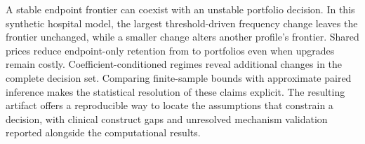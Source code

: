 A stable endpoint frontier can coexist with an unstable portfolio decision.
In this synthetic hospital model, the largest threshold-driven frequency
change leaves the frontier unchanged, while a smaller change alters another
profile's frontier. Shared prices reduce endpoint-only retention from
\CertGuaranteedTotal{} to \JointRetainedFloored{} portfolios even when
upgrades remain costly. Coefficient-conditioned regimes reveal additional
changes in the complete decision set. Comparing finite-sample bounds with
approximate paired inference makes the statistical resolution of these
claims explicit. The resulting artifact offers a reproducible way to locate
the assumptions that constrain a decision, with clinical construct gaps and
unresolved mechanism validation reported alongside the computational results.
